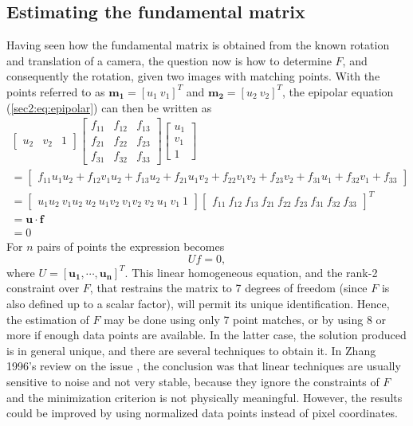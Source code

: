 \subsection{Estimating the fundamental matrix}
\label{einvonrev}
Having seen how the fundamental matrix is obtained from the known rotation and translation of a camera, the question now is how to determine $F$, and consequently the rotation, given two images with matching points. With the points referred to as $\mathbf{m_{1}} = [u_{1} \ v_{1}]^T$ and $\mathbf{m_{2}} = [u_{2}  \ v_{2}]^T$, the epipolar equation (\ref{sec2:eq:epipolar}) can then be written as
\begin{equation}
\label{deofepnf}
\begin{aligned}
\begin{bmatrix}
u_2 & v_2 & 1
\end{bmatrix}
\begin{bmatrix}
f_{11} & f_{12} & f_{13}  \\
f_{21} & f_{22} & f_{23}  \\
f_{31} & f_{32} & f_{33} 
\end{bmatrix}
\begin{bmatrix}
u_{1} \\ v_{1} \\ 1
\end{bmatrix}\\
=
\begin{bmatrix}
f_{11} u_1 u_2 + f_{12} v_1 u_2  + f_{13}u_2 + f_{21} u_1 v_2  + f_{22} v_1 v_2  + f_{23}v_2  + f_{31} u_1 + f_{32} v_1 + f_{33} 
\end{bmatrix}\\
=
\begin{bmatrix}
u_1u_2 \ v_1u_2 \ u_2 \ u_1v_2 \ v_1v_2 \  v_2 \ u_1 \ v_1 \ 1 
\end{bmatrix}
\begin{bmatrix}
f_{11} \ f_{12} \ f_{13} \ f_{21} \ f_{22} \ f_{23} \ f_{31} \ f_{32} \ f_{33}
\end{bmatrix}^T\\
= \mathbf{u} \cdot \mathbf{f}\\ = 0
\end{aligned}
\end{equation}
For $n$ pairs of points the expression becomes 
\begin{equation}
\label{sec2:eq:nsets}
U f = 0,
\end{equation}
where $U = \left[ \mathbf{u_ { 1 }} , \cdots , \mathbf{u_ { n }} \right] ^ { T }$. 
This linear homogeneous equation, and the rank-2 constraint over $F$, that restrains the matrix to 7 degrees of freedom (since $F$ is also defined up to a scalar factor), will permit its unique identification. 
Hence, the estimation of $F$ may be done using only 7 point matches, or by using 8 or more if enough data points are available. In the latter case, the solution produced is in general unique, and there are several techniques to obtain it. In Zhang 1996's review on the issue \cite{detep}, the conclusion was that linear techniques are usually sensitive to noise and not very stable, because they ignore the constraints of $F$ and the minimization criterion is not physically meaningful. However, the results could be improved by using normalized data points instead of pixel coordinates. 

